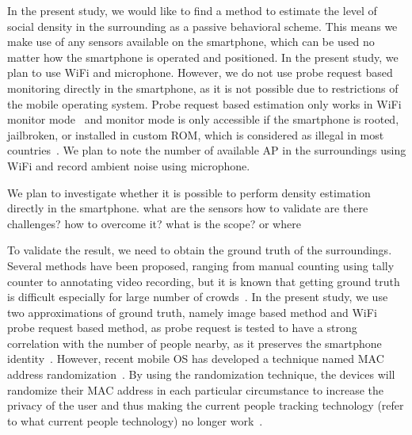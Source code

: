In the present study, we would like to find a method to estimate the level of social density in the surrounding as a passive behavioral scheme. This means we make use of any sensors available on the smartphone, which can be used no matter how the smartphone is operated and positioned. In the present study, we plan to use WiFi and microphone. However, we do not use probe request based monitoring directly in the smartphone, as it is not possible due to restrictions of the mobile operating system. Probe request based estimation only works in WiFi monitor mode~\cite{thesis052,thesis079} and monitor mode is only accessible if the smartphone is rooted, jailbroken, or installed in custom \ac{ROM}, which is considered as illegal in most countries~\cite{rootjailbreak}. We plan to note the number of available \ac{AP} in the surroundings using WiFi and record ambient noise using microphone.

We plan to investigate whether it is possible to perform density estimation directly in the smartphone.
what are the sensors
how to validate
are there challenges? how to overcome it?
what is the scope? or where 

To validate the result, we need to obtain the ground truth of the surroundings. Several methods have been proposed, ranging from manual counting using tally  counter to annotating video recording, but it is known that getting ground truth is difficult especially for large number of crowds~\cite{thesis006}. In the present study, we use two approximations of ground truth, namely image based method and WiFi probe request based method, as probe request is tested to have a strong correlation with the number of people nearby, as it preserves the smartphone identity~\cite{thesis047}. However, recent mobile \ac{OS} has developed a technique named \ac{MAC} address randomization~\cite{thesis062,thesis061}. By using the randomization technique, the devices will randomize their \ac{MAC} address in each particular circumstance to increase the privacy of the user and thus making the current people tracking technology (refer to what current people technology) no longer work~\cite{thesis079}.




